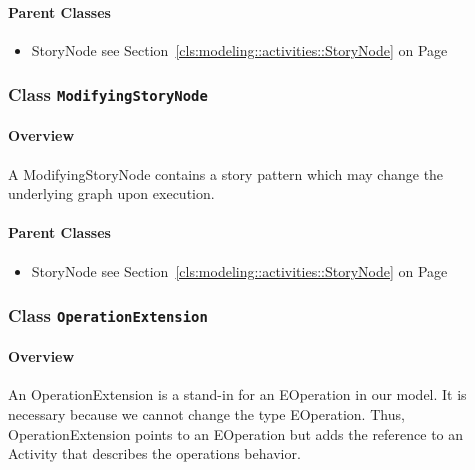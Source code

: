 	



\paragraph{Parent Classes}
\begin{itemize}
\item StoryNode see Section~\ref{cls:modeling::activities::StoryNode} on Page~\pageref{cls:modeling::activities::StoryNode}\end{itemize}
\subsubsection{\Large{Class \bfseries \texttt{ModifyingStoryNode}\normalfont}}
\label{cls:modeling::activities::ModifyingStoryNode} 
\paragraph{Overview}

	
			
A ModifyingStoryNode contains a story pattern which may change the underlying graph upon execution.	
		
	



\paragraph{Parent Classes}
\begin{itemize}
\item StoryNode see Section~\ref{cls:modeling::activities::StoryNode} on Page~\pageref{cls:modeling::activities::StoryNode}\end{itemize}
\subsubsection{\Large{Class \bfseries \texttt{OperationExtension}\normalfont}}
\label{cls:modeling::activities::OperationExtension} 
\paragraph{Overview}

	
			
An OperationExtension is a stand-in for an EOperation in our model. It is necessary because we cannot change the type EOperation. Thus, OperationExtension points to an EOperation but adds the reference to an Activity that describes the operations behavior.	
		
